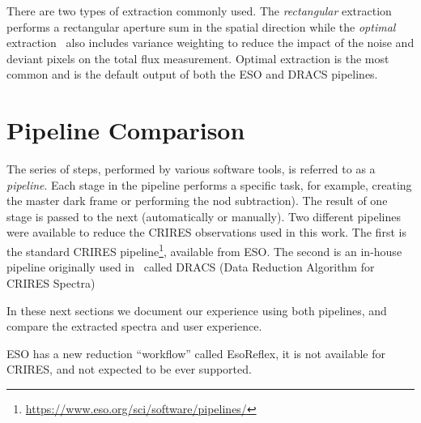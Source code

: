 There are two types of extraction commonly used. The \emph{rectangular} extraction performs a rectangular aperture sum in the spatial direction while the \emph{optimal} extraction~\citep{horne_optimal_1986} also includes variance weighting to reduce the impact of the noise and deviant pixels on the total flux measurement. Optimal extraction is the most common and is the default output of both the ESO and DRACS pipelines.

\section{Pipeline Comparison}
The series of steps, performed by various software tools, is referred to as a \emph{pipeline}. Each stage in the pipeline performs a specific task, for example, creating the master dark frame or performing the nod subtraction). The result of one stage is passed to the next (automatically or manually). Two different pipelines were available to reduce the CRIRES observations used in this work. The first is the standard CRIRES pipeline\footnote{\href{https://www.eso.org/sci/software/pipelines/}{https://www.eso.org/sci/software/pipelines/}}, available from ESO.
The second is an in-house pipeline originally  used in~\citet{figueira_radial_2010} called DRACS (Data Reduction Algorithm for CRIRES Spectra) 

In these next sections we document our experience using both pipelines, and compare the extracted spectra and user experience.

ESO has a new reduction ``workflow'' called EsoReflex, it is not available for CRIRES, and not expected to be ever supported.


